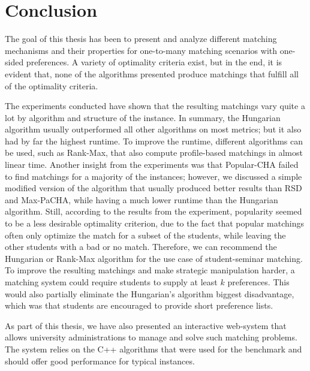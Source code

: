 \section{Conclusion}

The goal of this thesis has been to present and analyze different matching mechanisms and their properties for one-to-many matching scenarios with one-sided preferences. A variety of optimality criteria exist, but in the end, it is evident that, none of the algorithms presented produce matchings that fulfill all of the optimality criteria. 

The experiments conducted have shown that the resulting matchings vary quite a lot by algorithm and structure of the instance. In summary, the Hungarian algorithm usually outperformed all other algorithms on most metrics; but it also had by far the highest runtime. To improve the runtime, different algorithms can be used, such as Rank-Max, that also compute profile-based matchings in almost linear time. Another insight from the experiments was that Popular-CHA failed to find matchings for a majority of the instances; however, we discussed a simple modified version of the algorithm that usually produced better results than RSD and Max-PaCHA, while having a much lower runtime than the Hungarian algorithm. Still, according to the results from the experiment, popularity seemed to be a less desirable optimality criterion, due to the fact that popular matchings often only optimize the match for a subset of the students, while leaving the other students with a bad or no match. Therefore, we can recommend the Hungarian or Rank-Max algorithm for the use case of student-seminar matching. To improve the resulting matchings and make strategic manipulation harder, a matching system could require students to supply at least $k$ preferences. This would also partially eliminate the Hungarian's algorithm biggest disadvantage, which was that students are encouraged to provide short preference lists.

As part of this thesis, we have also presented an interactive web-system that allows university administrations to manage and solve such matching problems. The system relies on the C++ algorithms that were used for the benchmark and should offer good performance for typical instances.  